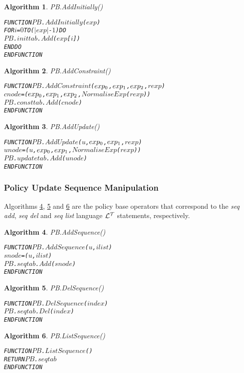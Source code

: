 \documentclass[11pt]{report}
\newenvironment{vverbatim}
{
  \begin{alltt}
}
{
    \vspace{-\baselineskip}
  \end{alltt}
}
\newtheorem{vvalgorithm}{Algorithm}[chapter]
\newenvironment{valgorithm}[2]
{
  \begin{vvalgorithm}{#1}
    \label{#2}
    \small
    \begin{vverbatim}
}
{
    \end{vverbatim}
  \end{vvalgorithm}
}
\begin{document}
          \begin{valgorithm}{PB.AddInitially()}{algo-impln-adini}
FUNCTION \(PB\).\(AddInitially\)(\(exp\))
  FOR \(i\) = \(0\) TO (\(|exp|\) - \(1\)) DO
    \(PB\).\(inittab\).\(Add\)(\(exp\)[\(i\)])
  ENDDO
ENDFUNCTION
          \end{valgorithm}

          \begin{valgorithm}{PB.AddConstraint()}{algo-impln-adcon}
FUNCTION \(PB\).\(AddConstraint\)(\(exp\sb{0}\), \(exp\sb{1}\), \(exp\sb{2}\), \(rexp\))
  \(cnode\) = (\(exp\sb{0}\), \(exp\sb{1}\), \(exp\sb{2}\), \(NormaliseExp\)(\(rexp\)))
  \(PB\).\(consttab\).\(Add\)(\(cnode\))
ENDFUNCTION
          \end{valgorithm}

          \begin{valgorithm}{PB.AddUpdate()}{algo-impln-adupd}
FUNCTION \(PB\).\(AddUpdate\)(\(u\), \(exp\sb{0}\), \(exp\sb{1}\), \(rexp\))
  \(unode\) = (\(u\), \(exp\sb{0}\), \(exp\sb{1}\), \(NormaliseExp\)(\(rexp\)))
  \(PB\).\(updatetab\).\(Add\)(\(unode\))
ENDFUNCTION
          \end{valgorithm}

        \subsubsection{Policy Update Sequence Manipulation}

          Algorithms \ref{algo-impln-adseq}, \ref{algo-impln-deseq} and
          \ref{algo-impln-lsseq} are the policy base operators that correspond
          to the {\em seq add}, {\em seq del} and {\em seq list} language
          ${\cal L^T}$ statements, respectively.

          \begin{valgorithm}{PB.AddSequence()}{algo-impln-adseq}
FUNCTION \(PB\).\(AddSequence\)(\(u\), \(ilist\))
  \(snode\) = (\(u\), \(ilist\))
  \(PB\).\(seqtab\).\(Add\)(\(snode\))
ENDFUNCTION
          \end{valgorithm}

          \begin{valgorithm}{PB.DelSequence()}{algo-impln-deseq}
FUNCTION \(PB\).\(DelSequence\)(\(index\))
  \(PB\).\(seqtab\).\(Del\)(\(index\))
ENDFUNCTION
          \end{valgorithm}

          \begin{valgorithm}{PB.ListSequence()}{algo-impln-lsseq}
FUNCTION \(PB\).\(ListSequence\)(\(\))
  RETURN \(PB\).\(seqtab\)
ENDFUNCTION
          \end{valgorithm}
\end{document}
